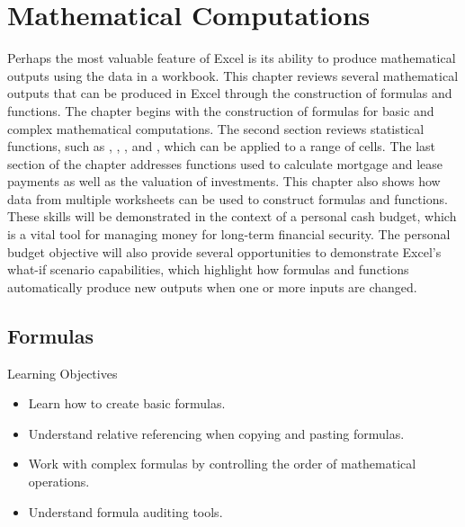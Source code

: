 \chapter{Mathematical Computations}\label{ch02:mathematical_computations}

Perhaps the most valuable feature of Excel is its ability to produce mathematical outputs using the data in a workbook. This chapter reviews several mathematical outputs that can be produced in Excel through the construction of formulas and functions. The chapter begins with the construction of formulas for basic and complex mathematical computations. The second section reviews statistical functions, such as , , , and , which can be applied to a range of cells. The last section of the chapter addresses functions used to calculate mortgage and lease payments as well as the valuation of investments. This chapter also shows how data from multiple worksheets can be used to construct formulas and functions. These skills will be demonstrated in the context of a personal cash budget, which is a vital tool for managing money for long-term financial security. The personal budget objective will also provide several opportunities to demonstrate Excel's what-if scenario capabilities, which highlight how formulas and functions automatically produce new outputs when one or more inputs are changed.

\section{Formulas}

\begin{center}
	\begin{objbox}{Learning Objectives}
		\begin{itemize}
			\setlength{\itemsep}{0pt}
			\setlength{\parskip}{0pt}
			\setlength{\parsep}{0pt}
			
			\item Learn how to create basic formulas.
			\item Understand relative referencing when copying and pasting formulas.
			\item Work with complex formulas by controlling the order of mathematical operations.
			\item Understand formula auditing tools.

		\end{itemize}
	\end{objbox}
\end{center}

